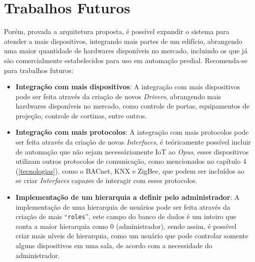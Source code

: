 \section{Trabalhos Futuros}
\label{trabalhos_futuros}

Porém, provada a arquitetura proposta, é possível expandir o sistema para atender a mais dispositivos, integrando mais partes de um edifício, abrangendo uma
maior quantidade de hardwares disponíveis no mercado, incluindo os que já são comercialmente estabelecidos para uso em automação predial.
Recomenda-se para trabalhos futuros:
\begin{itemize}
    \item \textbf{Integração com mais dispositivos}: A integração com mais dispositivos pode ser feita através da criação de novos \emph{Drivers}, 
    abrangendo mais hardwares disponíveis no mercado, como controle de portas, equipamentos de projeção, controle de cortinas, entre outros.
    \item \textbf{Integração com mais protocolos}: A integração com mais protocolos pode ser feita através da criação de novas \emph{Interfaces},
    é teóricamente possível incluir de automação que não sejam necessáriamente IoT ao \emph{Opus}, esses dispositivos utilizam outros protocolos de comunicação,
    como mencionados no capítulo 4 (\ref{tecnologias}), como o BACnet, KNX e ZigBee, que podem ser incluídos ao se criar \emph{Interfaces} capazes de interagir
    com esses protocolos.
    \item \textbf{Implementação de um hierarquia a definir pelo administrador}: A implementação de uma hierarquia de usuários pode ser feita através da criação
    de mais ``\lstinline{roles}'', este campo do banco de dados é um inteiro que conta a maior hierarquia como 0 (administrador), sendo assim, é possível criar
    mais níveis de hierarquia, como um usuário que pode controlar somente alguns dispositivos em uma sala, de acordo com a necessidade do administrador.
\end{itemize}